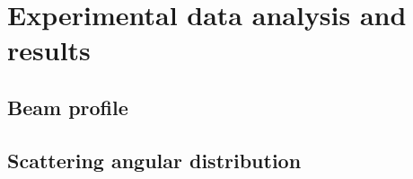 \documentclass[../../main/main.tex]{subfiles}
\begin{document}
\section{Experimental data analysis and results}



\subsection{Beam profile}



\subsection{Scattering angular distribution}
\end{document}
